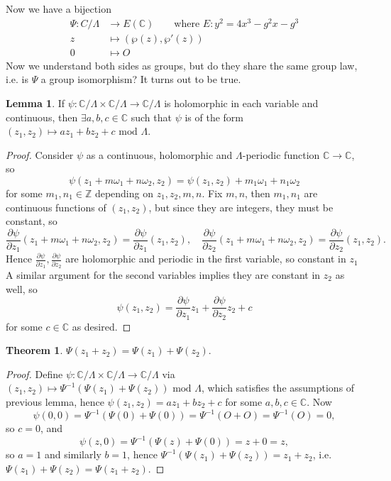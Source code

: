 \documentclass{article}
\newcommand{\Z}{\mathbb{Z}}
\newcommand{\C}{\mathbb{C}}
\newcommand{\Mod}{\text{ mod }}
\theoremstyle{definition}
\newtheorem{thm}[defn]{Theorem}
\newtheorem{lemma}[defn]{Lemma}
\begin{document}
Now we have a bijection
\[
\begin{aligned}
\Psi:C/\Lambda&\rightarrow E(\C)\qquad\text{where }E:y^2=4x^3-g^2x-g^3 \\
z&\mapsto (\wp(z),\wp'(z)) \\
0&\mapsto O
\end{aligned}
\]
Now we understand both sides as groups, but do they share the same group law, i.e. is $\Psi$ a group isomorphism? It turns out to be true.

\begin{lemma}
If $\psi:\C/\Lambda\times\C/\Lambda\rightarrow\C/\Lambda$ is holomorphic in each variable and continuous, then $\exists a,b,c\in\C$ such that $\psi$ is of the form $(z_1,z_2)\mapsto az_1+bz_2+c\Mod \Lambda$.
\end{lemma}
\begin{proof}
Consider $\psi$ as a continuous, holomorphic and $\Lambda$-periodic function $\C\rightarrow\C$, so
\[
\psi(z_1+m\omega_1+n\omega_2,z_2)=\psi(z_1,z_2)+m_1\omega_1+n_1\omega_2
\]
for some $m_1,n_1\in\Z$ depending on $z_1,z_2,m,n$. Fix $m,n$, then $m_1,n_1$ are continuous functions of $(z_1,z_2)$, but since they are integers, they must be constant, so
\[
\frac{\partial\psi}{\partial z_1}(z_1+m\omega_1+n\omega_2,z_2)=\frac{\partial\psi}{\partial z_1}(z_1,z_2),\quad \frac{\partial\psi}{\partial z_2}(z_1+m\omega_1+n\omega_2,z_2)=\frac{\partial\psi}{\partial z_2}(z_1,z_2).
\]
Hence $\frac{\partial\psi}{\partial z_1},\frac{\partial\psi}{\partial z_2}$ are holomorphic and periodic in the first variable, so constant in $z_1$ A similar argument for the second variables implies they are constant in $z_2$ as well, so
\[
\psi(z_1,z_2)=\frac{\partial\psi}{\partial z_1}z_1+\frac{\partial\psi}{\partial z_2}z_2+c
\]
for some $c\in\C$ as desired.
\end{proof}

\begin{thm}
$\Psi(z_1+z_2)=\Psi(z_1)+\Psi(z_2)$.
\end{thm}
\begin{proof}
Define $\psi:\C/\Lambda\times\C/\Lambda\rightarrow\C/\Lambda$ via $(z_1,z_2)\mapsto \Psi^{-1}(\Psi(z_1)+\Psi(z_2))\Mod\Lambda$, which satisfies the assumptions of previous lemma, hence $\psi(z_1,z_2)=az_1+bz_2+c$ for some $a,b,c\in\C$. Now
\[
\psi(0,0)=\Psi^{-1}(\Psi(0)+\Psi(0))=\Psi^{-1}(O+O)=\Psi^{-1}(O)=0,
\]
so $c=0$, and
\[
\psi(z,0)=\Psi^{-1}(\Psi(z)+\Psi(0))=z+0=z,
\]
so $a=1$ and similarly $b=1$, hence $\Psi^{-1}(\Psi(z_1)+\Psi(z_2))=z_1+z_2$, i.e. $\Psi(z_1)+\Psi(z_2)=\Psi(z_1+z_2)$.
\end{proof}
\end{document}
